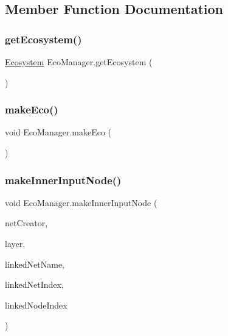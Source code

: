 \subsection{Member Function Documentation}
\mbox{\label{class_eco_manager_ac4afac929280d605388d110a4a0a2840}} 
\subsubsection{\texorpdfstring{get\+Ecosystem()}{getEcosystem()}}
{\footnotesize\ttfamily \mbox{\hyperlink{class_ecosystem}{Ecosystem}} Eco\+Manager.\+get\+Ecosystem (\begin{DoxyParamCaption}{ }\end{DoxyParamCaption})}

\mbox{\label{class_eco_manager_ab7ee9ad1b41a4dbb9c8cb5f4c001e469}} 
\subsubsection{\texorpdfstring{make\+Eco()}{makeEco()}}
{\footnotesize\ttfamily void Eco\+Manager.\+make\+Eco (\begin{DoxyParamCaption}{ }\end{DoxyParamCaption})}

\mbox{\label{class_eco_manager_a01ca1dd0c8bb417a67cbb83fe84b894d}} 
\subsubsection{\texorpdfstring{make\+Inner\+Input\+Node()}{makeInnerInputNode()}}
{\footnotesize\ttfamily void Eco\+Manager.\+make\+Inner\+Input\+Node (\begin{DoxyParamCaption}\item[{\mbox{\hyperlink{class_network_editor}{Network\+Editor}}}]{net\+Creator,  }\item[{int}]{layer,  }\item[{string}]{linked\+Net\+Name,  }\item[{int}]{linked\+Net\+Index,  }\item[{int}]{linked\+Node\+Index }\end{DoxyParamCaption})}

